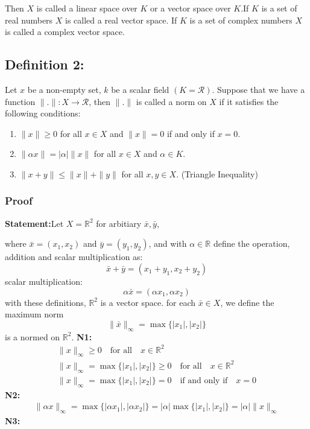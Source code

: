 \documentclass[12pt]{article}
\begin{document}
Then $X$ is called a linear space over $K$ or a vector space over $K$.If $K$ is a set of real numbers $X$ is called a real vector space. If $K$ is a set of complex numbers $X$ is called a complex vector space.

\subsection*{Definition 2:} Let $x$ be a non-empty set, $k$ be a scalar field $(K = \mathcal{R})$. Suppose that we have a function $\|.\|: X \to \mathcal{R}$, then $\|.\|$ is called a norm on $X$ if it satisfies the following conditions:

\begin{enumerate}
    \item $\|x\| \geq 0$ for all $x \in X$ and $\|x\| = 0$ if and only if $x = 0$.
    \item $\|\alpha x\| = |\alpha|\|x\|$ for all $x \in X$ and $\alpha \in K$.
    \item $\|x + y\| \leq \|x\| + \|y\|$ for all $x, y \in X$. (Triangle Inequality)
    \end{enumerate}

\subsubsection*{Proof}

\textbf{Statement:}Let $X = \mathbb{R}^{2}$ for arbitiary $\bar{x}, \bar{y}$,

where $\bar{x} = (x_{1}, x_{2})$ and $\bar{y} = (y_{1}, y_{2})$, and with $\alpha \in \mathbb{R}$  define the operation, addition and scalar multiplication as:
\[\bar{x} + \bar{y} = (x_{1} + y_{1}, x_{2} + y_{2})\]
scalar multiplication:
\[\alpha \bar{x} = (\alpha x_{1}, \alpha x_{2})\]
with these definitions, $\mathbb{R}^{2}$ is a vector space.
for each $\bar{x} \in X$, we define the maximum norm
\[\|\bar{x}\|_{\infty} = \max\{|x_{1}|, |x_{2}|\}\] is a normed on $\mathbb{R}^{2}$.
\newline
\textbf{N1:}
\begin{eqnarray*}
    \|x\|_{\infty} \geq 0 \quad \text{for all} \quad x \in \mathbb{R}^{2} \\
    \|x\|_{\infty} = \max\{|x_{1}|, |x_{2}|\} \geq 0 \quad \text{for all} \quad x \in \mathbb{R}^{2} \\
    \|x\|_{\infty} = \max\{|x_{1}|, |x_{2}|\} = 0 \quad \text{if and only if} \quad x = 0
\end{eqnarray*}
\newline
\textbf{N2:}
\newline
\begin{eqnarray*}
    \|\alpha x\|_{\infty} = \max\{|\alpha x_{1}|, |\alpha x_{2}|\} = |\alpha|\max\{|x_{1}|, |x_{2}|\} = |\alpha|\|x\|_{\infty}
\end{eqnarray*}
\textbf{N3:}
\newblock
\end{document}
